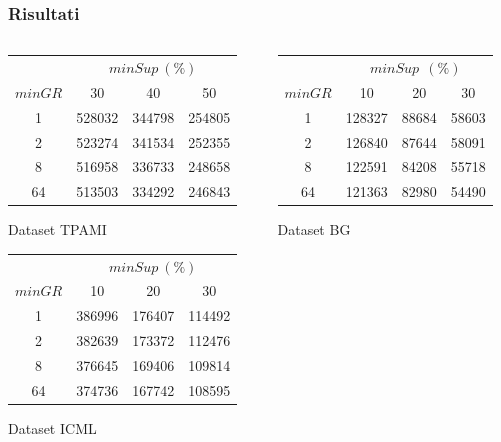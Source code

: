 \documentclass{beamer}
\begin{document}
\begin{frame}
\frametitle{Risultati}

\begin{scriptsize}

\begin{columns}
\begin{column}{0.4\textwidth}
	\begin{tabular}{c | ccc}
	\toprule
	 & \multicolumn{3}{c}{$minSup\ (\%)$} \\
	$minGR$ & 30 & 40 & 50 \\
	\hline
	1  & 528032 & 344798 & 254805 \\
	2  & 523274 & 341534 & 252355 \\
	8  & 516958 & 336733 & 248658 \\
	64 & 513503 & 334292 & 246843 \\
	\bottomrule
	\end{tabular}
Dataset TPAMI
	\vspace{8 mm}
	
	\begin{tabular}{c | ccc}
	\toprule
	 & \multicolumn{3}{c}{$minSup\ (\%)$} \\
	$minGR$ & 10 & 20 & 30 \\
	\hline
	1  & 386996 & 176407 & 114492 \\
	2  & 382639 & 173372 & 112476 \\
	8  & 376645 & 169406 & 109814 \\
	64 & 374736 & 167742 & 108595 \\
	\bottomrule
	\end{tabular}
Dataset ICML

\end{column}

\begin{column}{0.4\textwidth}
	\begin{tabular}{c | ccc}
	\toprule
	 & \multicolumn{3}{c}{$minSup\ \ (\%)$} \\
	$minGR$ & 10 & 20 & 30 \\
	\hline
	1  & 128327 & 88684 & 58603 \\
	2  & 126840 & 87644 & 58091 \\
	8  & 122591 & 84208 & 55718 \\
	64 & 121363 & 82980 & 54490 \\
	\bottomrule
	\end{tabular}
Dataset BG

\end{column}
\end{columns}

\end{scriptsize}
\end{frame}
\end{document}

